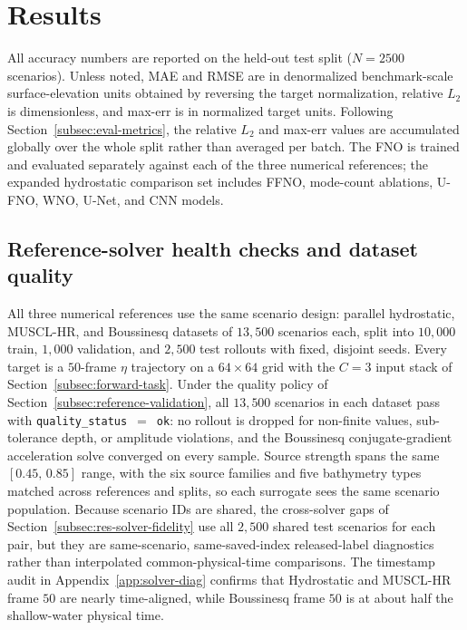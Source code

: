 \section{Results}
\label{sec:results}

All accuracy numbers are reported on the held-out test split ($N = 2500$ scenarios). Unless noted, MAE and RMSE are in denormalized benchmark-scale surface-elevation units obtained by reversing the target normalization, relative $L_2$ is dimensionless, and max-err is in normalized target units. Following Section~\ref{subsec:eval-metrics}, the relative $L_2$ and max-err values are accumulated globally over the whole split rather than averaged per batch. The FNO is trained and evaluated separately against each of the three numerical references; the expanded hydrostatic comparison set includes FFNO, mode-count ablations, U-FNO, WNO, U-Net, and CNN models.

\subsection{Reference-solver health checks and dataset quality}
\label{subsec:res-dataset}

All three numerical references use the same scenario design: parallel hydrostatic, MUSCL-HR, and Boussinesq datasets of $13{,}500$ scenarios each, split into $10{,}000$ train, $1{,}000$ validation, and $2{,}500$ test rollouts with fixed, disjoint seeds. Every target is a $50$-frame $\eta$ trajectory on a $64\times64$ grid with the $C=3$ input stack of Section~\ref{subsec:forward-task}. Under the quality policy of Section~\ref{subsec:reference-validation}, all $13{,}500$ scenarios in each dataset pass with \texttt{quality\_status}~$=$~\texttt{ok}: no rollout is dropped for non-finite values, sub-tolerance depth, or amplitude violations, and the Boussinesq conjugate-gradient acceleration solve converged on every sample. Source strength spans the same $[0.45,\, 0.85]$ range, with the six source families and five bathymetry types matched across references and splits, so each surrogate sees the same scenario population. Because scenario IDs are shared, the cross-solver gaps of Section~\ref{subsec:res-solver-fidelity} use all $2{,}500$ shared test scenarios for each pair, but they are same-scenario, same-saved-index released-label diagnostics rather than interpolated common-physical-time comparisons. The timestamp audit in Appendix~\ref{app:solver-diag} confirms that Hydrostatic and MUSCL-HR frame $50$ are nearly time-aligned, while Boussinesq frame $50$ is at about half the shallow-water physical time.

